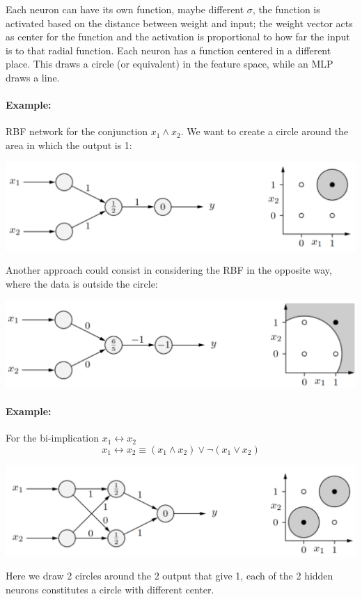 \documentclass[11pt]{article}
\begin{document}
		Each neuron can have its own function, maybe different $\sigma$, the function is activated based on the distance between weight and input; the weight vector acts as center for the function and the activation is proportional to how far the input is to that radial function. Each neuron has a function centered in a different place. This draws a circle (or equivalent) in the feature space, while an MLP draws a line.\\
		
		\paragraph{Example:} RBF network for the conjunction $x_1 \wedge x_2$. We want to create a circle around the area in which the output is 1:
		\begin{center}
			\includegraphics[width=0.8\columnwidth]{img/NN/RBF1}
		\end{center}
		Another approach could consist in considering the RBF in the opposite way, where the data is outside the circle:
		\begin{center}
			\includegraphics[width=0.8\columnwidth]{img/NN/RBF2}
		\end{center}
		
		\newpage
		
		\paragraph{Example:} For the bi-implication $x_1 \leftrightarrow x_2$
		$$ x_1 \leftrightarrow x_2 \equiv (x_1 \wedge x_2) \vee \neg (x_1 \vee x_2) $$
		\begin{center}
			\includegraphics[width=0.75\columnwidth]{img/NN/RBF3}
		\end{center}
		Here we draw 2 circles around the 2 output that give 1, each of the 2 hidden neurons constitutes a circle with different center.\\
		
\end{document}

